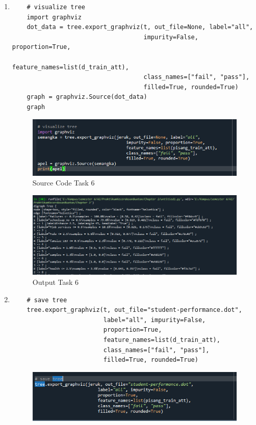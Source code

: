 \begin{enumerate}
\item
\begin{verbatim}
	# visualize tree
	import graphviz
	dot_data = tree.export_graphviz(t, out_file=None, label="all", 
									impurity=False, proportion=True,
	                                feature_names=list(d_train_att), 
									class_names=["fail", "pass"], 
	                                filled=True, rounded=True)
	graph = graphviz.Source(dot_data)
	graph
\end{verbatim}
\begin{figure}[h]
    \centering
    \includegraphics[scale=1]{figures/chapter 2/sklearn/11.png}
    \caption{Source Code Task 6}
    \label{fig:mesh1}
\end{figure}
\begin{figure}[h]
    \centering
    \includegraphics[scale=0.6]{figures/chapter 2/sklearn/12.png}
    \caption{Output Task 6}
    \label{fig:mesh1}
\end{figure}
\newpage \item
\begin{verbatim}
	# save tree
	tree.export_graphviz(t, out_file="student-performance.dot", 
						 label="all", impurity=False, 
						 proportion=True,
	                     feature_names=list(d_train_att), 
	                     class_names=["fail", "pass"], 
	                     filled=True, rounded=True)
\end{verbatim}
\begin{figure}[h]
    \centering
    \includegraphics[scale=0.8]{figures/chapter 2/sklearn/13.png}

\end{figure}
\end{enumerate}
